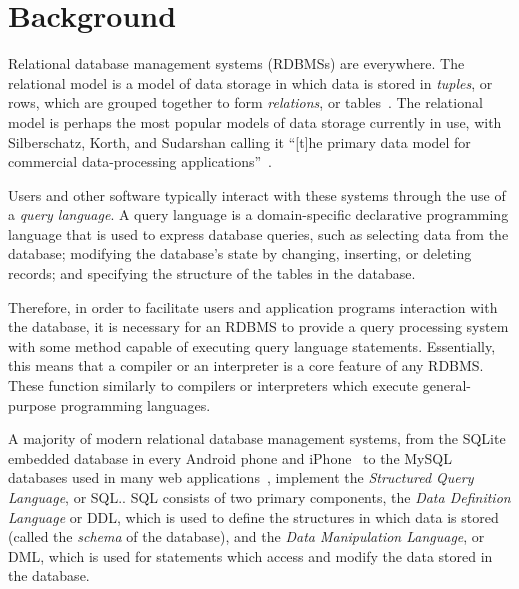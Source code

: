 

\usepackage{minted}
\usepackage{hyperref}
\usepackage{cleveref}
\usepackage{lmodern}
\usepackage{placeins}


\MYHEADERS{}
\PLEDGE{}
\tableofcontents
\listoflistings
\vfill
\pagebreak
\section{Background}

Relational database management systems (RDBMSs) are everywhere. The relational model is a model of data storage in which data is stored in \textit{tuples}, or rows, which are grouped together to form \textit{relations}, or tables~\cite{silberschatz2010database,harrington2009relational,garcia2000database}. The relational model is perhaps the most popular models of data storage currently in use, with Silberschatz, Korth, and Sudarshan calling it ``[t]he primary data model for commercial data-processing applications''~\cite[page 39]{silberschatz2010database}.

Users and other software typically interact with these systems through the use of a \textit{query language}. A query language is a domain-specific declarative programming language that is used to express database queries, such as selecting data from the database; modifying the database's state by changing, inserting, or deleting records; and specifying the structure of the tables in the database. 

Therefore, in order to facilitate users and application programs interaction with the database, it is necessary for an RDBMS to provide a query processing system with some method capable of executing query language statements. Essentially, this means that a compiler or an interpreter is a core feature of any RDBMS. These function similarly to compilers or interpreters which execute general-purpose programming languages.

A majority of modern relational database management systems, from the SQLite embedded database in every Android phone and iPhone~\cite{sqliteFamous} to the MySQL databases used in many web applications~\cite{onLamp}, implement the \textit{Structured Query Language}, or SQL.\cite{silberschatz2010database}. 
SQL consists of two primary components, the \textit{Data Definition Language} or DDL, which is used to define the structures in which data is stored (called the \textit{schema} of the database), and the \textit{Data Manipulation Language}, or DML, which is used for statements which access and modify the data stored in the database.

